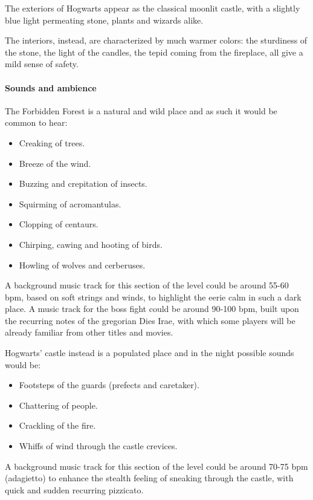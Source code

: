 The exteriors of Hogwarts appear as the classical moonlit castle, with a slightly blue light permeating stone, plants and wizards alike.

\clearpage
The interiors, instead, are characterized by much warmer colors: the sturdiness of the stone, the light of the candles, the tepid coming from the fireplace, all give a mild sense of safety.

\clearpage

\paragraph{Sounds and ambience}

The Forbidden Forest is a natural and wild place and as such it would be common to hear:
\begin{itemize}
	\item Creaking of trees.
	\item Breeze of the wind.
	\item Buzzing and crepitation of insects.
	\item Squirming of acromantulas.
	\item Clopping of centaurs.
	\item Chirping, cawing and hooting of birds.
	\item Howling of wolves and cerberuses.
\end{itemize}

A background music track for this section of the level could be around 55-60 bpm, based on soft strings and winds, to highlight the eerie calm in such a dark place.
A music track for the boss fight could be around 90-100 bpm, built upon the recurring notes of the gregorian Dies Irae, with which some players will be already familiar from other titles and movies.

Hogwarts' castle instead is a populated place and in the night possible sounds would be:
\begin{itemize}
	\item Footsteps of the guards (prefects and caretaker).
	\item Chattering of people.
	\item Crackling of the fire.
	\item Whiffs of wind through the castle crevices.
\end{itemize}
A background music track for this section of the level could be around 70-75 bpm (adagietto) to enhance the stealth feeling of sneaking through the castle, with quick and sudden recurring pizzicato.

\clearpage